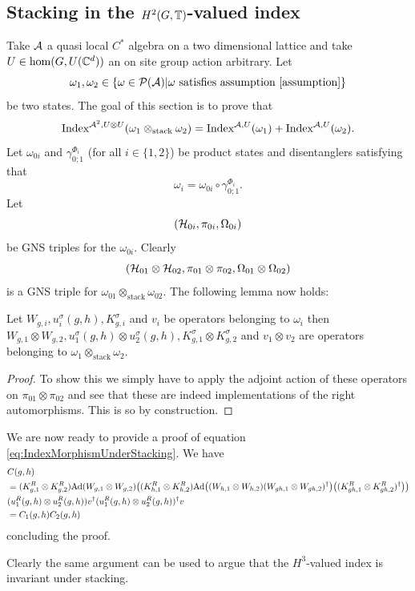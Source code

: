 \documentclass[12pt,a4paper,twoside]{article}
\numberwithin{equation}{section}
\begin{document}
\subsection{Stacking in the $H^2(G,\TT)$-valued index}\label{sec:StackingOneTranslation}
Take $\AA$ a quasi local $C^*$ algebra on a two dimensional lattice and take $U\in\hom(G,U(\CC^d))$ an on site group action arbitrary. Let
\begin{equation}
	\omega_1,\omega_2\in\{\omega\in\PP(\AA)|\omega\text{ satisfies assumption \ref{assumption}}\}
\end{equation}
be two states. The goal of this section is to prove that
\begin{equation}\label{eq:IndexMorphismUnderStacking}
	\textrm{Index}^{\AA^2,U\otimes U}(\omega_1\otimes_{\text{stack}}\omega_2)=\textrm{Index}^{\AA,U}(\omega_1)+\textrm{Index}^{\AA,U}(\omega_2).
\end{equation}
Let $\omega_{0i}$ and $\gamma_{0;1}^{\Phi_i}$ (for all $i\in\{1,2\}$) be product states and disentanglers satisfying that
\begin{equation}
	\omega_i=\omega_{0i}\circ\gamma_{0;1}^{\Phi_i}.
\end{equation}
Let
\begin{equation}
	(\HH_{0i},\pi_{0i},\Omega_{0i})
\end{equation}
be GNS triples for the $\omega_{0i}$. Clearly
\begin{equation}
	(\HH_{01}\otimes\HH_{02},\pi_{01}\otimes\pi_{02},\Omega_{01}\otimes\Omega_{02})
\end{equation}
is a GNS triple for $\omega_{01}\otimes_{\text{stack}}\omega_{02}$. The following lemma now holds:
\begin{lemma}
	Let $W_{g,i},u^\sigma_i(g,h),K_{g,i}^\sigma$ and $v_{i}$ be operators belonging to $\omega_i$ then $W_{g,1}\otimes W_{g,2},u^\sigma_1(g,h)\otimes u^\sigma_2(g,h),K_{g,1}^\sigma\otimes K_{g,2}^\sigma$ and $v_{1}\otimes v_{2}$ are operators belonging to $\omega_1\otimes_{\text{stack}}\omega_2$.
\end{lemma}
\begin{proof}
	To show this we simply have to apply the adjoint action of these operators on $\pi_{01}\otimes\pi_{02}$ and see that these are indeed implementations of the right automorphisms. This is so by construction.
\end{proof}
We are now ready to provide a proof of equation \ref{eq:IndexMorphismUnderStacking}. We have
\begin{align}
	&C(g,h)\\
	\nonumber
	&=(K_{g,1}^R\otimes K_{g,2}^R)\Ad{W_{g,1}\otimes W_{g,2}}\left((K_{h,1}^R\otimes K_{h,2}^R)\Ad{(W_{h,1}\otimes W_{h,2})(W_{gh,1}\otimes W_{gh,2})^\dagger}\left((K_{gh,1}^R\otimes K_{gh,2}^R)^\dagger\right)\right)\\
	&(u^R_1(g,h)\otimes u^R_2(g,h))v^\dagger (u^R_1(g,h)\otimes u^R_2(g,h))^\dagger v\\
	&=C_1(g,h)C_2(g,h)
\end{align}
concluding the proof.
\begin{remark}\label{rem:StackingH3ValuedIndex}
	Clearly the same argument can be used to argue that the $H^3$-valued index is invariant under stacking.
\end{remark}
\end{document}
